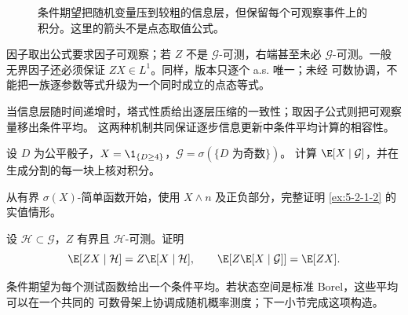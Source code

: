 \begin{figure}[htbp]
\centering
{}
\caption{条件期望把随机变量压到较粗的信息层，但保留每个可观察事件上的积分。这里的箭头不是点态取值公式。}
\label{fig:5-2-1-information-compression}
\end{figure}

因子取出公式要求因子可观察；若 $Z$ 不是 $\mathcal G$-可测，右端甚至未必
$\mathcal G$-可测。一般无界因子还必须保证 $ZX\in L^1$。同样，版本只逐个 a.s. 唯一；未经
可数协调，不能把一族逐参数等式升级为一个同时成立的点态等式。

当信息层随时间递增时，塔式性质给出逐层压缩的一致性；取因子公式则把可观察量移出条件平均。
这两种机制共同保证逐步信息更新中条件平均计算的相容性。

\begin{exercise}[有限信息上的保费]
设 $D$ 为公平骰子，$X=\1_{\{D\geq4\}}$，$\mathcal G=\sigma(\{D\text{ 为奇数}\})$。
计算 $\E[X\mid\mathcal G]$，并在生成分割的每一块上核对积分。
\end{exercise}

\begin{exercise}[独立信息的截断证明]
从有界 $\sigma(X)$-简单函数开始，使用 $X\wedge n$ 及正负部分，完整证明
\cref{ex:5-2-1-2} 的实值情形。
\end{exercise}

\begin{exercise}[塔式性质与已知因子]
设 $\mathcal H\subset\mathcal G$，$Z$ 有界且 $\mathcal H$-可测。证明
\[
 \E[ZX\mid\mathcal H]=Z\E[X\mid\mathcal H],
 \qquad
 \E[Z\E[X\mid\mathcal G]]=\E[ZX].
\]
\end{exercise}

条件期望为每个测试函数给出一个条件平均。若状态空间是标准 Borel，这些平均可以在一个共同的
可数骨架上协调成随机概率测度；下一小节完成这项构造。


